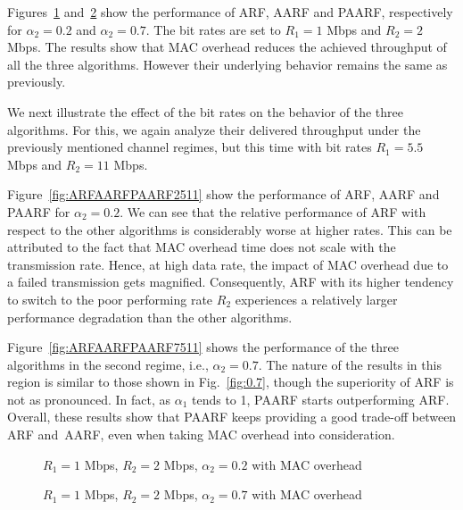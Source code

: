 \documentclass[11pt, journal, letterpaper, oneside, onecolumn]{IEEEtran}
\newcommand{\linegap}{1}
\begin{document}
Figures~\ref{fig:ARFAARFPAARF212} and~\ref{fig:ARFAARFPAARF712}  show the performance of ARF, AARF
and PAARF, respectively for $\alpha_{2}=0.2$ and $\alpha_{2}=0.7$. The bit rates are set to $R_{1}=1$ Mbps and $R_{2}=2$ Mbps. The results show that MAC overhead reduces the achieved throughput of all the three
algorithms. However their underlying behavior remains the same as previously.



We next illustrate the effect of the bit rates on the
behavior of the three algorithms. For this, we again analyze
their delivered throughput under the previously mentioned channel
regimes, but this time with bit rates $R_{1}=5.5$ Mbps and $R_{2}=11$ Mbps.



Figure~\ref{fig:ARFAARFPAARF2511} show the performance of ARF, AARF and PAARF for $\alpha_{2}=0.2$. We can see that the relative performance of ARF with respect to the other algorithms is considerably worse at higher rates. This can be attributed to the fact that MAC overhead time does not scale
with the transmission rate. Hence, at high data rate, the impact of MAC overhead due to a failed transmission gets magnified. Consequently, ARF with its higher tendency to switch to the
poor performing rate $R_{2}$ experiences a relatively larger performance
degradation than the other algorithms.


Figure~\ref{fig:ARFAARFPAARF7511} shows the performance of the three
algorithms in the second regime, i.e., $\alpha_{2}=0.7$. The nature of the
results in this region is similar to those shown in
Fig.~\ref{fig:0.7}, though the superiority of ARF is not as pronounced. In fact, as $\alpha_{1}$ tends to 1, PAARF starts outperforming ARF.
Overall, these results show that PAARF keeps providing a good trade-off between ARF and~AARF, even when taking MAC overhead into consideration.



\begin{figure}[t]
\centering
{}
\caption{$R_{1}=1$ Mbps, $R_{2}=2$ Mbps, $\alpha_{2}=0.2$ with MAC
overhead} \label{fig:ARFAARFPAARF212}
\end{figure}
\renewcommand{\baselinestretch}{\linegap}

\begin{figure}[t]
\centering
{}
\caption{$R_{1}=1$ Mbps, $R_{2}=2$ Mbps, $\alpha_{2}=0.7$ with MAC
overhead} \label{fig:ARFAARFPAARF712}
\end{figure}
\renewcommand{\baselinestretch}{\linegap}
\end{document}
